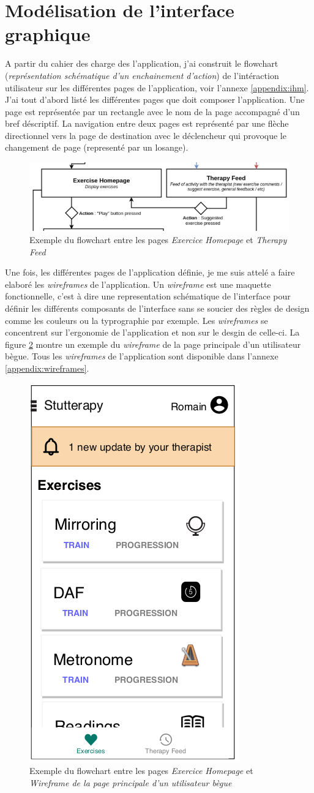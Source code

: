 \section{Modélisation de l'interface graphique}

A partir du cahier des charge des l'application, j'ai construit le flowchart (\textit{représentation schématique d'un enchainement d'action}) de l'intéraction utilisateur sur les différentes pages de l'application, voir l'annexe \ref{appendix:ihm}. J'ai tout d'abord listé les différentes pages que doit composer l'application. Une page est représentée par un rectangle avec le nom de la page accompagné d'un bref déscriptif. La navigation entre deux pages est représenté par une flèche directionnel vers la page de destination avec le déclencheur qui provoque le changement de page (representé par un losange).

\begin{figure}[H]
  \includegraphics[width=.8\linewidth]{content/imgs/ihm_ex.png}
  \caption{Exemple du flowchart entre les pages \textit{Exercice Homepage} et \textit{Therapy Feed}}
  \label{fig:flowchart}
\end{figure}

Une fois, les différentes pages de l'application définie, je me suis attelé a faire elaboré les \textit{wireframes} de l'application. Un \textit{wireframe} est une maquette fonctionnelle, c'est à dire une representation schématique de l'interface pour définir les différents composants de l'interface sans se soucier des règles de design comme les couleurs ou la typrographie par exemple. Les \textit{wireframes} se concentrent sur l'ergonomie de l'application et non sur le desgin de celle-ci. La figure \ref{fig:wireframe} montre un exemple du \textit{wireframe} de la page principale d'un utilisateur bègue. Tous les \textit{wireframes} de l'application sont disponible dans l'annexe \ref{appendix:wireframes}.


\begin{figure}[H]
  \includegraphics[width=.3\linewidth]{content/imgs/wireframe_ex.png}
  \caption{Exemple du flowchart entre les pages \textit{Exercice Homepage} et \textit{Wireframe de la page principale d'un utilisateur bègue}}
  \label{fig:wireframe}
\end{figure}
